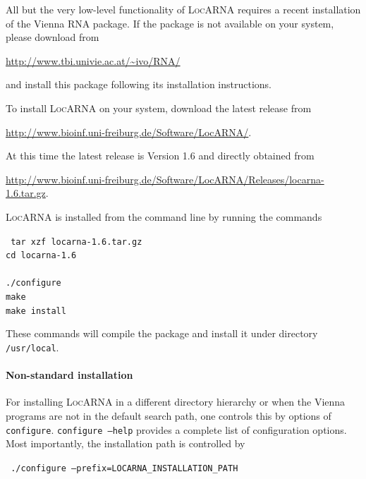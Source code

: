\documentclass{article}
\newcommand{\LocARNA}{\textsc{LocARNA}}
\newenvironment{ttbox}{%
  \begin{framed}\begin{minipage}{1.0\textwidth}\tt}%
{\end{minipage}\end{framed}}
\begin{document}
All but the very low-level functionality of \LocARNA{} requires a recent
installation of the Vienna RNA package. If the package is not
available on your system, please download from
\begin{center}
  \url{http://www.tbi.univie.ac.at/~ivo/RNA/}
\end{center}
and install this package
following its installation instructions.

To install \LocARNA{} on your system, download the latest release from
\begin{center}
  \url{http://www.bioinf.uni-freiburg.de/Software/LocARNA/}.
\end{center}
At this time the latest release is Version 1.6 and directly obtained
from
\begin{center}
  \url{http://www.bioinf.uni-freiburg.de/Software/LocARNA/Releases/locarna-1.6.tar.gz}.
\end{center}

\LocARNA{} is installed from the command line by running the commands

\begin{ttbox}
  tar xzf locarna-1.6.tar.gz\\
  cd locarna-1.6\\
  \\
  ./configure \\
  make\\
  make install\\
\end{ttbox}
\noindent
These commands will compile the package and install it under directory
\texttt{/usr/local}. 

\paragraph{Non-standard installation} For installing \LocARNA{} in a
different directory hierarchy or when the Vienna programs are not in
the default search path, one controls this by options of
\texttt{configure}. \texttt{configure --help} provides a complete list
of configuration options. Most importantly, the
installation path is controlled by
\begin{ttbox}
  ./configure --prefix=LOCARNA\_INSTALLATION\_PATH
\end{ttbox}
 
\end{document}
